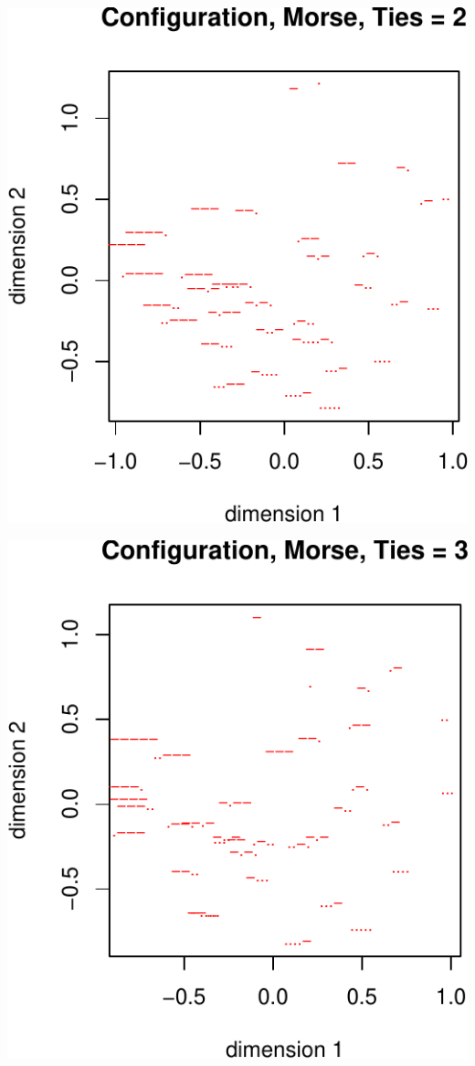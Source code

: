 \documentclass[
  12pt,
]{article}
\begin{document}
\begin{center}\includegraphics{smacofRO_files/figure-latex/plotmorseconfs-2} \end{center}

\begin{center}\includegraphics{smacofRO_files/figure-latex/plotmorseconfs-3} \end{center}
\end{document}
